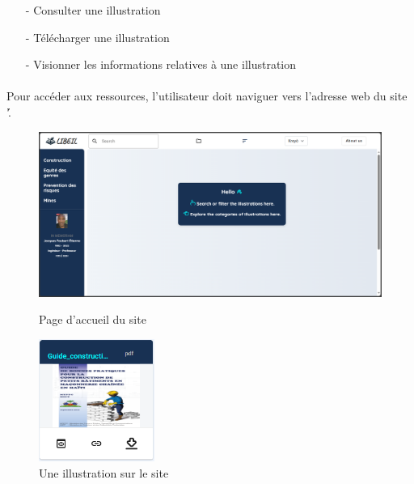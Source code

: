 		\begin{itemize}
			\item[-] Consulter une illustration
			\item[-] T\'el\'echarger une illustration
			\item[-] Visionner les informations relatives \`a une illustration
		\end{itemize} 
		
		
		\paragraph{} Pour acc\'eder aux ressources, l'utilisateur doit naviguer vers l'adresse web du site '\websiteURL\'. 
					
				
		\begin{figure}
			\centering
			\begin{minipage}{0.45\textwidth}
				\centering
				\includegraphics[width=\textwidth]{Pictures/PageDAccueil.png}
				\caption{Page d'accueil du site}
				\label{FigAccueilSU}
			\end{minipage}
			\hspace{5pt}
			\begin{minipage}{0.3\textwidth}
				\centering
				\includegraphics[height=4cm]{Pictures/IllustrationCard.png}
				\caption{Une illustration sur le site}
				\label{FigIllustrationCard}
			\end{minipage}
		\end{figure}
	
